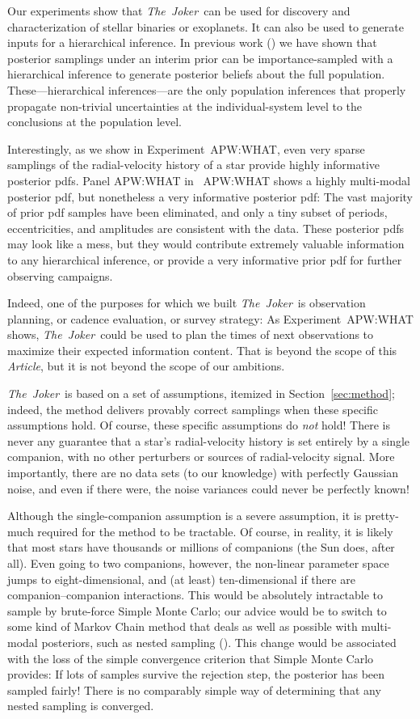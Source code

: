 \documentclass[manuscript, letterpaper]{aastex6}
\newcommand{\project}[1]{\textsl{#1}}
\newcommand{\samplername}{\project{The~Joker}}
\newcommand{\documentname}{\textsl{Article}}
\newcommand{\sectionname}{Section}
\begin{document}
Our experiments show that \samplername\ can be used for discovery and
characterization of stellar binaries or exoplanets.
It can also be used to generate inputs for a hierarchical inference.
In previous work (\citealt{hoggeccentricity, dfmexopop}) we have shown
that posterior samplings under an interim prior can be importance-sampled
with a hierarchical inference to generate posterior beliefs about the
full population.
These---hierarchical inferences---are the only population inferences
that properly propagate non-trivial uncertainties at the
individual-system level to the conclusions at the population level.

Interestingly, as we show in Experiment~APW:WHAT, even very sparse
samplings of the radial-velocity history of a star provide highly
informative posterior pdfs.
Panel APW:WHAT in \figurename~APW:WHAT shows a highly multi-modal
posterior pdf, but nonetheless a very informative posterior pdf:
The vast majority of prior pdf samples have been eliminated, and
only a tiny subset of periods, eccentricities, and amplitudes are
consistent with the data.
These posterior pdfs may look like a mess, but they would contribute
extremely valuable information to any hierarchical inference, or
provide a very informative prior pdf for further observing campaigns.

Indeed, one of the purposes for which we built \samplername\ is
observation planning, or cadence evaluation, or survey strategy:
As Experiment~APW:WHAT shows, \samplername\ could be used to plan the
times of next observations to maximize their expected information
content.
That is beyond the scope of this \documentname, but it is not beyond
the scope of our ambitions.

\samplername\ is based on a set of assumptions, itemized in
\sectionname~\ref{sec:method}; indeed, the method delivers provably
correct samplings when these specific assumptions hold.
Of course, these specific assumptions do \emph{not} hold!
There is never any guarantee that a star's radial-velocity history
is set entirely by a single companion, with no other perturbers or
sources of radial-velocity signal.
More importantly, there are no data sets (to our knowledge) with
perfectly Gaussian noise, and even if there were, the noise variances
could never be perfectly known!

Although the single-companion assumption is a severe assumption, it
is pretty-much required for the method to be tractable.
Of course, in reality, it is likely that most stars have thousands or
millions of companions (the Sun does, after all).
Even going to two companions, however, the non-linear parameter space
jumps to eight-dimensional, and (at least) ten-dimensional if there
are companion--companion interactions.
This would be absolutely intractable to sample by brute-force Simple
Monte Carlo; our advice would be to switch to some kind of Markov
Chain method that deals as well as possible with multi-modal
posteriors, such as nested sampling (\citealt{skilling, brewer}).
This change would be associated with the loss of the simple
convergence criterion that Simple Monte Carlo provides: If lots of
samples survive the rejection step, the posterior has been sampled
fairly!
There is no comparably simple way of determining that any nested
sampling is converged.
\end{document}
